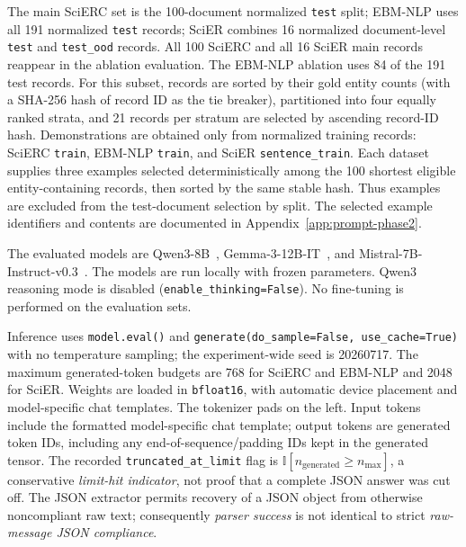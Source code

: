\documentclass[fleqn,10pt]{wlscirep-authoryear}
\begin{document}
The main SciERC set is the 100-document normalized \texttt{test} split;
EBM-NLP uses all 191 normalized \texttt{test} records; SciER combines 16
normalized document-level \texttt{test} and \texttt{test\_ood} records. All
100 SciERC and all 16 SciER main records reappear in the ablation evaluation.
The EBM-NLP ablation uses 84 of the 191 test records. For this subset, records
are sorted by their gold entity counts (with a SHA-256 hash of record ID as the
tie breaker), partitioned into four equally ranked strata, and 21 records per
stratum are selected by ascending record-ID hash. Demonstrations are obtained
only from normalized training records: SciERC \texttt{train}, EBM-NLP
\texttt{train}, and SciER \texttt{sentence\_train}. Each dataset supplies three
examples selected deterministically among the 100 shortest eligible
entity-containing records, then sorted by the same stable hash. Thus examples
are excluded from the test-document selection by split. The selected example
identifiers and contents are documented in Appendix~\ref{app:prompt-phase2}.

The evaluated models are Qwen3-8B~\cite{yang2025qwen3},
Gemma-3-12B-IT~\cite{gemmateam2025gemma3}, and
Mistral-7B-Instruct-v0.3~\cite{jiang2023mistral}. The models are run locally with
frozen parameters. Qwen3 reasoning mode is disabled
(\texttt{enable\_thinking=False}). No fine-tuning is performed on the evaluation
sets.

Inference uses \texttt{model.eval()} and \texttt{generate(do\_sample=False,
use\_cache=True)} with no temperature sampling; the experiment-wide seed is
20260717. The maximum generated-token budgets are 768 for SciERC and EBM-NLP
and 2048 for SciER. Weights are loaded in \texttt{bfloat16}, with automatic
device placement and model-specific chat templates. The tokenizer pads on the
left. Input tokens include the formatted model-specific chat template; output
tokens are generated token IDs, including any end-of-sequence/padding IDs kept
in the generated tensor. The recorded \texttt{truncated\_at\_limit} flag is
\(\mathbb{I}[n_{\mathrm{generated}}\geq n_{\max}]\), a conservative
\emph{limit-hit indicator}, not proof that a complete JSON answer was cut off.
The JSON extractor permits recovery of a JSON object from otherwise noncompliant
raw text; consequently \emph{parser success} is not identical to strict
\emph{raw-message JSON compliance}.
\end{document}
